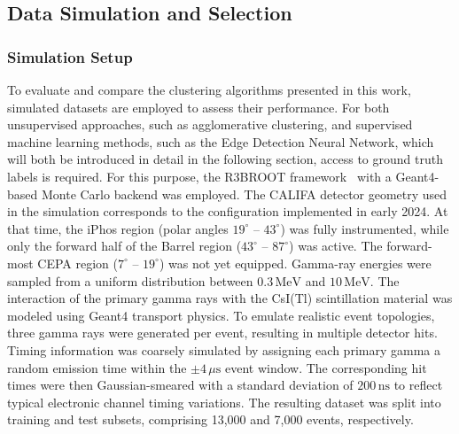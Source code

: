 \subsection{Data Simulation and Selection}

\subsubsection{Simulation Setup}
To evaluate and compare the clustering algorithms presented in this work, simulated datasets are employed to assess their performance. For both unsupervised approaches, such as agglomerative clustering, and supervised machine learning methods, such as the Edge Detection Neural Network, which will both be introduced in detail in the following section, access to ground truth labels is required. For this purpose, the R3BROOT framework~\cite{bertini2011r3broot} with a Geant4-based Monte Carlo \cite{agostinelli2003geant4} backend was employed.\newline
The CALIFA detector geometry used in the simulation corresponds to the configuration implemented in early 2024. At that time, the iPhos region (polar angles $19^\circ$ -- $43^\circ$) was fully instrumented, while only the forward half of the Barrel region ($43^\circ$ -- $87^\circ$) was active. The forward-most CEPA region ($7^\circ$ -- $19^\circ$) was not yet equipped.\newline
Gamma-ray energies were sampled from a uniform distribution between $0.3\,\mathrm{MeV}$ and $10\,\mathrm{MeV}$. The interaction of the primary gamma rays with the CsI(Tl) scintillation material was modeled using Geant4 transport physics.\newline
To emulate realistic event topologies, three gamma rays were generated per event, resulting in multiple detector hits. Timing information was coarsely simulated by assigning each primary gamma a random emission time within the $\pm 4\,\mu\mathrm{s}$ event window. The corresponding hit times were then Gaussian-smeared with a standard deviation of $200\,\mathrm{ns}$ to reflect typical electronic channel timing variations.\newline
The resulting dataset was split into training and test subsets, comprising 13{,}000 and 7{,}000 events, respectively.
